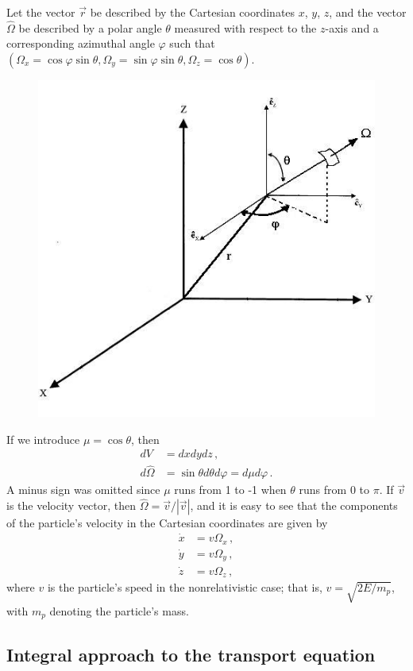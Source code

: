 \documentclass[12pt]{article}
\newcommand{\rvec}{\ensuremath{\vec{r}}}
\newcommand{\omvec}{\ensuremath{\hat{\Omega}}}
\begin{document}
 Let the vector $\rvec$ be described by the Cartesian coordinates $x$, $y$, $z$, and the vector
$\omvec$ be described by a polar angle $\theta$ measured with respect to the $z$-axis
 and a corresponding azimuthal angle $\varphi$ such that $(\Omega_x=\cos\varphi \sin\theta, \Omega_y = \sin\varphi \sin\theta, \Omega_z = \cos\theta)$.
\begin{figure}%
\includegraphics[height=10 cm,width=10 cm]{../figs/fig2_1.jpg}
\end{figure}
 If we introduce $\mu = \cos\theta$, then
\begin{align*}
dV &= dxdydz\,,
\\
d\omvec &=  \sin\theta d\theta d\varphi = d\mu d\varphi\,. 
\end{align*}
A minus sign was omitted since $\mu$ runs from
1 to -1 when $\theta$ runs from 0 to $\pi$.
If $\vec{v}$ is the velocity vector, then $\omvec = \vec{v}/{|\vec{v}|}$,
and
it is easy to see that the components of the particle's velocity in the Cartesian
coordinates are given by
\begin{align*}
\dot x &=  v\Omega_x\,,\\
\dot y &=  v\Omega_y\,,\\
\dot z &=  v\Omega_z\,,
\end{align*}
 where $v$ is the particle's speed in the nonrelativistic case; that is, $v = \sqrt{2E/m_p}$, with $m_p$
denoting the particle's mass.

\subsection*{Integral approach to the transport equation}
\end{document}
